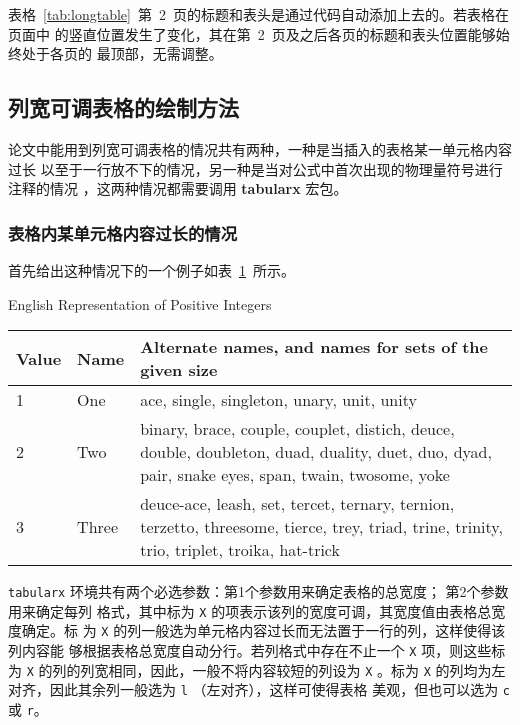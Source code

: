 表格~\ref{tab:longtable}~第~2~页的标题和表头是通过代码自动添加上去的。若表格在页面中
的竖直位置发生了变化，其在第~2~页及之后各页的标题和表头位置能够始终处于各页的
最顶部，无需调整。

\subsection{列宽可调表格的绘制方法}

论文中能用到列宽可调表格的情况共有两种，一种是当插入的表格某一单元格内容过长
以至于一行放不下的情况，另一种是当对公式中首次出现的物理量符号进行注释的情况
，这两种情况都需要调用 \textbf{tabularx} 宏包。

\subsubsection{表格内某单元格内容过长的情况}

首先给出这种情况下的一个例子如表~\ref{tab:tabularx}~所示。

\begin{table}[htbp]
          {English Representation of Positive Integers}
\label{tab:tabularx}
\begin{tabularx}{\textwidth}{llX}
\toprule
Value & Name & Alternate names, and names for sets of the given size\\
\midrule
1 & One & ace, single, singleton, unary, unit, unity\\
2 & Two & binary, brace, couple, couplet, distich, deuce, double, doubleton, duad, duality, duet, duo, dyad, pair, snake eyes, span, twain, twosome, yoke\\
3 & Three & deuce-ace, leash, set, tercet, ternary, ternion, terzetto, threesome, tierce, trey, triad, trine, trinity, trio, triplet, troika, hat-trick\\\bottomrule
\end{tabularx}
\end{table}

\texttt{tabularx} 环境共有两个必选参数：第1个参数用来确定表格的总宽度；
第2个参数用来确定每列
格式，其中标为 \texttt{X} 的项表示该列的宽度可调，其宽度值由表格总宽度确定。标
为 \texttt{X} 的列一般选为单元格内容过长而无法置于一行的列，这样使得该列内容能
够根据表格总宽度自动分行。若列格式中存在不止一个 \texttt{X} 项，则这些标为
\texttt{X} 的列的列宽相同，因此，一般不将内容较短的列设为 \texttt{X} 。标为
\texttt{X} 的列均为左对齐，因此其余列一般选为 \texttt{l} （左对齐），这样可使得表格
美观，但也可以选为 \texttt{c} 或 \texttt{r}。

